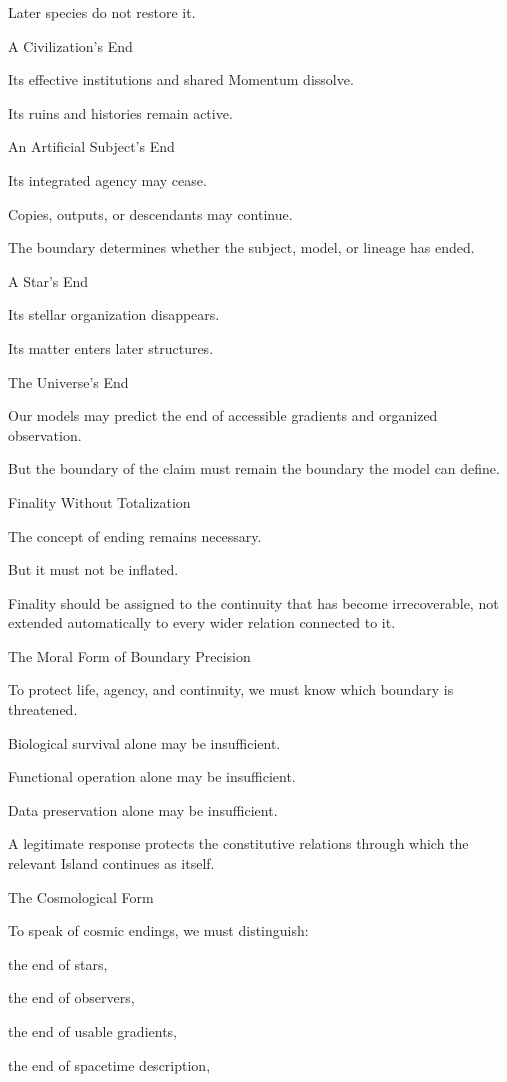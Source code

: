Later species do not restore it.

A Civilization’s End

Its effective institutions and shared Momentum dissolve.

Its ruins and histories remain active.

An Artificial Subject’s End

Its integrated agency may cease.

Copies, outputs, or descendants may continue.

The boundary determines whether the subject, model, or lineage has ended.

A Star’s End

Its stellar organization disappears.

Its matter enters later structures.

The Universe’s End

Our models may predict the end of accessible gradients and organized observation.

But the boundary of the claim must remain the boundary the model can define.

Finality Without Totalization

The concept of ending remains necessary.

But it must not be inflated.

Finality should be assigned to the continuity that has become irrecoverable, not extended automatically to every wider relation connected to it.

The Moral Form of Boundary Precision

To protect life, agency, and continuity, we must know which boundary is threatened.

Biological survival alone may be insufficient.

Functional operation alone may be insufficient.

Data preservation alone may be insufficient.

A legitimate response protects the constitutive relations through which the relevant Island continues as itself.

The Cosmological Form

To speak of cosmic endings, we must distinguish:

the end of stars,

the end of observers,

the end of usable gradients,

the end of spacetime description,

